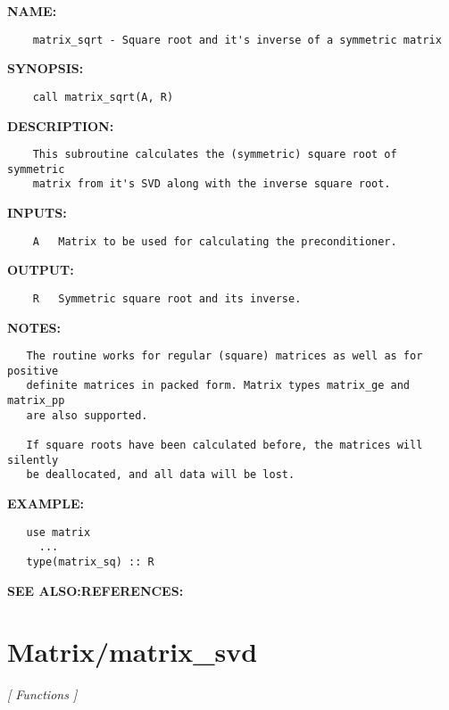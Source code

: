 \label{ch:robo31}
\label{ch:Matrix_matrix_sqrt}
\textbf{NAME:}\hspace{0.08in}\begin{Verbatim}
    matrix_sqrt - Square root and it's inverse of a symmetric matrix
\end{Verbatim}
\textbf{SYNOPSIS:}\hspace{0.08in}\begin{Verbatim}
    call matrix_sqrt(A, R)
\end{Verbatim}
\textbf{DESCRIPTION:}\hspace{0.08in}\begin{Verbatim}
    This subroutine calculates the (symmetric) square root of symmetric
    matrix from it's SVD along with the inverse square root.
\end{Verbatim}
\textbf{INPUTS:}\hspace{0.08in}\begin{Verbatim}
    A   Matrix to be used for calculating the preconditioner.
\end{Verbatim}
\textbf{OUTPUT:}\hspace{0.08in}\begin{Verbatim}
    R   Symmetric square root and its inverse.
\end{Verbatim}
\textbf{NOTES:}\hspace{0.08in}\begin{Verbatim}
   The routine works for regular (square) matrices as well as for positive
   definite matrices in packed form. Matrix types matrix_ge and matrix_pp
   are also supported.

   If square roots have been calculated before, the matrices will silently
   be deallocated, and all data will be lost.
\end{Verbatim}
\textbf{EXAMPLE:}\hspace{0.08in}\begin{Verbatim}
   use matrix
     ...
   type(matrix_sq) :: R
\end{Verbatim}
\textbf{SEE ALSO:}\hspace{0.08in}\textbf{REFERENCES:}\hspace{0.08in}\section{Matrix/matrix\_svd}
\textsl{[ Functions ]}

